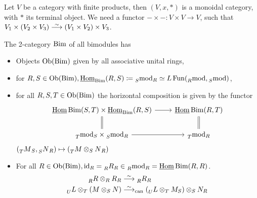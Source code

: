 \begin{exmp}
	Let $ V $ be a category with finite products, then $ ( V , x , * ) $ is a monoidal category, with $ * $ its terminal object.
	We need a functor $ - \times - \colon V \times V \to V $, such that $ V_1 \times ( V_2 \times V_3 ) \isomorphism ( V_1 \times V_2 ) \times V_3$.
\end{exmp}

\begin{exmp}	
	The 2-category $\operatorname{Bim}$ of all bimodules has 
	\begin{itemize}
		\item 
		Objects $ \operatorname{Ob} ( \operatorname{Bim} ) $ given by all associative unital rings,
		
		\item 
		for $ R , S \in \operatorname{Ob} ( \operatorname{Bim} ), \operatorname{\underline{Hom}}_{\operatorname{Bim}} ( R , S ) \coloneqq \prescript{}{S}{\operatorname{mod}}_R \simeq L \operatorname{Fun} ( \prescript{}{R}{\operatorname{mod}}, \prescript{}{S}{\operatorname{mod}})$,
		
		\item 
		for all $ R , S , T \in \operatorname{Ob} ( \operatorname{Bim} ) $ the horizontal composition is given by the functor 
		\[
		\begin{tikzcd}
			\twoHom{\Bim}(S,T) \times \twoHom_{\Bim}(R,S)
			\ar[r]
			\ar[d, equal]
			&
			\twoHom{\Bim}( R , T )
			\ar[d, equal]
			\\
			\prescript{}{T}{\Mod}_S \times \prescript{}{S}{\Mod}_R
			\ar[r]
			&
			\prescript{}{T}{\Mod}_R 
		\end{tikzcd}
		\] 
		$( \prescript{}{T}{M}_S , \prescript{}{S}{N}_R ) \mapsto (\prescript{}{T}{M \otimes_S N}_R)$
		
		\item 
		For all $ R \in \operatorname{Ob} ( \operatorname{Bim} ), \operatorname{id}_R = \prescript{}{R}{R}_R \in \prescript{}{R}{\operatorname{mod}}_R=\operatorname{\underline{Hom}}{\operatorname{Bim}}( R , R )$.
		\begin{align*}
			\prescript{}{R}{R} \otimes_R R_R 
			&\isomorphism 
			\prescript{}{R}{R}_R
			\\
			\prescript{}{U}{L} \otimes_T ( M \otimes_S N )
			&\isomorphism_{\can}
			( \prescript{}{U}{L} \otimes_T M_S ) \otimes_S N_R
		\end{align*}
	\end{itemize}
\end{exmp}

